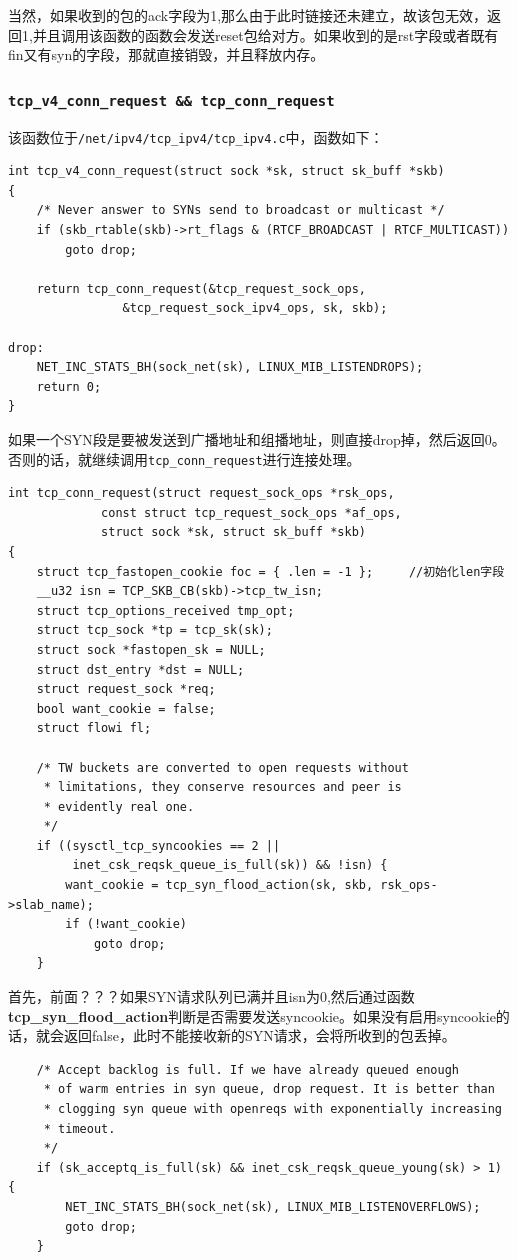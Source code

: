                 当然，如果收到的包的ack字段为1,那么由于此时链接还未建立，故该包无效，返回1,并且调用该函数的函数会发送reset包给对方。如果收到的是rst字段或者既有fin又有syn的字段，那就直接销毁，并且释放内存。

            \subsubsection{\texttt{tcp_v4_conn_request && tcp_conn_request}}

                该函数位于\texttt{/net/ipv4/tcp_ipv4/tcp_ipv4.c}中，函数如下：
\begin{verbatim}
int tcp_v4_conn_request(struct sock *sk, struct sk_buff *skb)
{
    /* Never answer to SYNs send to broadcast or multicast */
    if (skb_rtable(skb)->rt_flags & (RTCF_BROADCAST | RTCF_MULTICAST))
        goto drop;

    return tcp_conn_request(&tcp_request_sock_ops,
                &tcp_request_sock_ipv4_ops, sk, skb);

drop:
    NET_INC_STATS_BH(sock_net(sk), LINUX_MIB_LISTENDROPS);
    return 0;
}
\end{verbatim}
                
        如果一个SYN段是要被发送到广播地址和组播地址，则直接drop掉，然后返回0。否则的话，就继续调用\texttt{tcp_conn_request}进行连接处理。

\begin{verbatim}
int tcp_conn_request(struct request_sock_ops *rsk_ops,
             const struct tcp_request_sock_ops *af_ops,
             struct sock *sk, struct sk_buff *skb)
{
    struct tcp_fastopen_cookie foc = { .len = -1 };		//初始化len字段
    __u32 isn = TCP_SKB_CB(skb)->tcp_tw_isn;
    struct tcp_options_received tmp_opt;
    struct tcp_sock *tp = tcp_sk(sk);
    struct sock *fastopen_sk = NULL;
    struct dst_entry *dst = NULL;
    struct request_sock *req;
    bool want_cookie = false;
    struct flowi fl;

    /* TW buckets are converted to open requests without
     * limitations, they conserve resources and peer is
     * evidently real one.
     */
    if ((sysctl_tcp_syncookies == 2 ||
         inet_csk_reqsk_queue_is_full(sk)) && !isn) {
        want_cookie = tcp_syn_flood_action(sk, skb, rsk_ops->slab_name);
        if (!want_cookie)
            goto drop;
    }
\end{verbatim}
                首先，前面？？？如果SYN请求队列已满并且isn为0,然后通过函数\textbf{tcp\_syn\_flood\_action}判断是否需要发送syncookie。如果没有启用syncookie的话，就会返回false，此时不能接收新的SYN请求，会将所收到的包丢掉。
\begin{verbatim}
    /* Accept backlog is full. If we have already queued enough
     * of warm entries in syn queue, drop request. It is better than
     * clogging syn queue with openreqs with exponentially increasing
     * timeout.
     */
    if (sk_acceptq_is_full(sk) && inet_csk_reqsk_queue_young(sk) > 1) {
        NET_INC_STATS_BH(sock_net(sk), LINUX_MIB_LISTENOVERFLOWS);
        goto drop;
    }
\end{verbatim}

